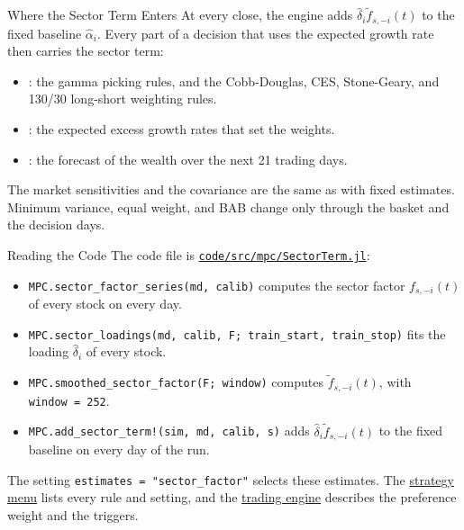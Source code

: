 \documentclass[aspectratio=169,11pt]{beamer}
\newcommand{\repo}{https://github.com/varnerlab/CHEME-5660-CourseRepository-Fall-2026/blob/main/lectures/week-15/L15a}
\newcommand{\engine}{https://github.com/varnerlab/CHEME-5660-CourseRepository-Fall-2026/blob/main/code/src/mpc}
\begin{document}
\begin{frame}{Where the Sector Term Enters}
  \vspace{0.3em}
  At every close, the engine adds $\hat{\delta}_{i}\tilde{f}_{s,-i}(t)$ to the fixed baseline $\hat{\alpha}_{i}$. Every part
  of a decision that uses the expected growth rate then carries the sector term:
  \begin{itemize}\setlength{\itemsep}{0.5em}
    \item {}: the gamma picking rules, and the Cobb-Douglas, CES, Stone-Geary, and 130/30
      long-short weighting rules.
    \item {}: the expected excess growth rates that set the weights.
    \item {}: the forecast of the wealth over the next 21 trading days.
  \end{itemize}

  \vspace{0.5em}
  The market sensitivities and the covariance are the same as with fixed estimates. Minimum variance, equal
  weight, and BAB change only through the basket and the decision days.
\end{frame}

\begin{frame}{Reading the Code}
  \vspace{0.3em}
  The code file is
  \href{\engine/SectorTerm.jl}{\texttt{code/src/mpc/SectorTerm.jl}}:
  \begin{itemize}\setlength{\itemsep}{0.5em}
    \item \texttt{MPC.sector\_factor\_series(md, calib)} computes the sector factor $f_{s,-i}(t)$ of every stock on every day.
    \item \texttt{MPC.sector\_loadings(md, calib, F; train\_start, train\_stop)} fits the loading $\hat{\delta}_{i}$ of every stock.
    \item \texttt{MPC.smoothed\_sector\_factor(F; window)} computes $\tilde{f}_{s,-i}(t)$, with \texttt{window~=~252}.
    \item \texttt{MPC.add\_sector\_term!(sim, md, calib, s)} adds $\hat{\delta}_{i}\tilde{f}_{s,-i}(t)$ to the fixed baseline on every day of the run.
  \end{itemize}

  \vspace{0.5em}
  The setting \texttt{estimates~=~"sector\_factor"} selects these estimates. The
  \href{\repo/strategies/CHEME-5660-L15a-Strategy-Menu-Fall-2026.ipynb}{strategy menu} lists every rule and setting, and the
  \href{\repo/engine/CHEME-5660-L15a-Trading-Engine-Fall-2026.ipynb}{trading engine} describes the preference weight and the triggers.
\end{frame}
\end{document}
